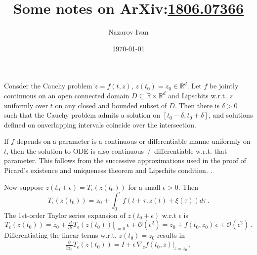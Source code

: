 \documentclass[a4paper]{article}
\title{Some notes on ArXiv:\url{1806.07366}}
\author{Nazarov Ivan}
\date{\today}
\newcommand{\real}{\mathbb{R}}
\begin{document}
\maketitle

\noindent
Consder the Cauchy problem $\dot{z} = f(t, z)$, $z(t_0) = z_0 \in \real^d$. Let $f$ be
jointly continuous on an open connected domain $D \subseteq \real \times \real^d$ and
Lipschits w.r.t. $z$ uniformly over $t$ on any closed and bounded subset of $D$. Then
there is $\delta > 0$ such that the Cauchy problem admits a solution on $[t_0 - \delta,
t_0 + \delta]$, and solutions defined on onverlapping intervals coincide over the
intersection.

If $f$ depends on a parameter is a continuous or differentiable manne uniformly on $t$,
then the solution to ODE is also continuous~/~differentiable w.r.t. that parameter. This
follows from the successive approximations used in the proof of Picard's existence and
uniqueness theorem and Lipschits condition.\footnotemark
{}.


Now suppose $z(t_0 + \epsilon) = T_\epsilon (z(t_0))$ for a small $\epsilon > 0$. Then
\begin{equation}
  T_\epsilon(z(t_0))
    = z_0 + \int_0^\epsilon f(t + \tau, z(t) + \xi(\tau)) d\tau
    \,.
\end{equation}
The 1st-order Taylor series expansion of $z(t_0 + \epsilon)$ w.r.t $\epsilon$ is
\begin{equation}
  T_\epsilon (z(t_0))
    = z_0 + \tfrac{d}{d\epsilon} T_\epsilon (z(t_0)) \Big\vert_{\epsilon = 0} \, \epsilon
      + \mathcal{O}(\epsilon^2)
    = z_0 + f(t_0, z_0) \, \epsilon
      + \mathcal{O}(\epsilon^2)
    \,.
\end{equation}
Differentiating the linear terms w.r.t. $z(t_0)=z_0$ results in
\begin{equation}
  \tfrac{\partial}{\partial z_0} T_\epsilon (z(t_0))
    = I + \epsilon \, \nabla_z f(t_0, z) \big \vert_{z=z_0}
    \,,
\end{equation}
\end{document}
